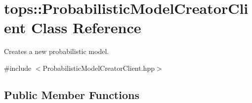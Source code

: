 \hypertarget{classtops_1_1ProbabilisticModelCreatorClient}{}\section{tops\+:\+:Probabilistic\+Model\+Creator\+Client Class Reference}
\label{classtops_1_1ProbabilisticModelCreatorClient}


Creates a new probabilistic model.  




{\ttfamily \#include $<$Probabilistic\+Model\+Creator\+Client.\+hpp$>$}

\subsection*{Public Member Functions}
